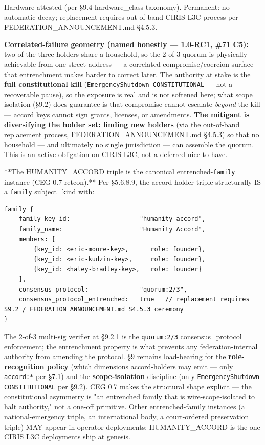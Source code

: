 \documentclass[11pt]{article}
\begin{document}
Hardware-attested (per §9.4 hardware\_class taxonomy). Permanent: no automatic decay; replacement requires out-of-band CIRIS L3C process per FEDERATION\_ANNOUNCEMENT.md §4.5.3.


\textbf{Correlated-failure geometry (named honestly — 1.0-RC1, \#71 C5):} two of the three holders share a household, so the 2-of-3 quorum is physically achievable from one street address — a correlated compromise/coercion surface that entrenchment makes harder to correct later. The authority at stake is the \textbf{full constitutional kill} (\texttt{EmergencyShutdown CONSTITUTIONAL} — not a recoverable pause), so the exposure is real and is not softened here; what scope isolation (§9.2) does guarantee is that compromise cannot escalate \textit{beyond} the kill — accord keys cannot sign grants, licenses, or amendments. \textbf{The mitigant is diversifying the holder set: finding new holders} (via the out-of-band replacement process, FEDERATION\_ANNOUNCEMENT.md §4.5.3) so that no household — and ultimately no single jurisdiction — can assemble the quorum. This is an active obligation on CIRIS L3C, not a deferred nice-to-have.


**The HUMANITY\_ACCORD triple is the canonical entrenched-\texttt{family} instance (CEG 0.7 retcon).** Per §5.6.8.9, the accord-holder triple structurally IS a \texttt{family} subject\_kind with:


\begin{lstlisting}
family {
    family_key_id:                   "humanity-accord",
    family_name:                     "Humanity Accord",
    members: [
        {key_id: <eric-moore-key>,      role: founder},
        {key_id: <eric-kudzin-key>,     role: founder},
        {key_id: <haley-bradley-key>,   role: founder}
    ],
    consensus_protocol:              "quorum:2/3",
    consensus_protocol_entrenched:   true   // replacement requires S9.2 / FEDERATION_ANNOUNCEMENT.md S4.5.3 ceremony
}
\end{lstlisting}

The 2-of-3 multi-sig verifier at §9.2.1 is the \texttt{quorum:2/3} consensus\_protocol enforcement; the entrenchment property is what prevents any federation-internal authority from amending the protocol. §9 remains load-bearing for the \textbf{role-recognition policy} (which dimensions accord-holders may emit — only \texttt{accord:*} per §7.1) and the \textbf{scope-isolation} discipline (only \texttt{EmergencyShutdown CONSTITUTIONAL} per §9.2). CEG 0.7 makes the structural shape explicit — the constitutional asymmetry is "an entrenched family that is wire-scope-isolated to halt authority," not a one-off primitive. Other entrenched-family instances (a national-emergency triple, an international body, a court-ordered preservation triple) MAY appear in operator deployments; HUMANITY\_ACCORD is the one CIRIS L3C deployments ship at genesis.
\end{document}
